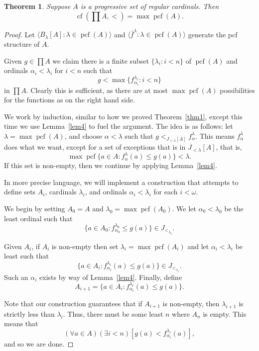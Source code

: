 \documentclass[10pt]{amsart}
\theoremstyle{plain}
\newtheorem{theorem}{Theorem}
\theoremstyle{definition}
\theoremstyle{remark}
\DeclareMathOperator{\cf}{cf}
\DeclareMathOperator{\pcf}{pcf}
\numberwithin{equation}{section}
\begin{document}
\begin{theorem}
\label{thm2}
Suppose $A$ is a progressive set of regular cardinals.  Then
\begin{equation}
\cf\left(\prod A, <\right) = \max\pcf(A).
\end{equation}
\end{theorem}
\begin{proof}
Let $\langle B_\lambda[A]:\lambda\in\pcf(A)\rangle$ and $\langle\bar{f}^\lambda:\lambda\in\pcf(A)\rangle$ generate the pcf structure of $A$.

Given $g\in\prod A$ we claim there is a finite subset $\{\lambda_i:i<n\}$ of $\pcf(A)$ and ordinals $\alpha_i<\lambda_i$ for $i<n$ such that
\begin{equation}
g<\max\{f^{\lambda_i}_{\alpha_i}:i<n\}
\end{equation}
in $\prod A$.  Clearly this is sufficient, as there are at most $\max\pcf(A)$ possibilities for the functions as on the right hand side.

We work by induction, similar to how we proved Theorem~\ref{thm1}, except this time we use Lemma~\ref{lem4} to fuel the argument. The idea is as follows: let $\lambda=\max\pcf(A)$, and choose $\alpha<\lambda$ such that $g<_{J_{<\lambda}[A]} f^\lambda_\alpha$.  This means $f^\lambda_\alpha$ does what we want, except for a set of exceptions that is in $J_{<\lambda}[A]$, that is,
\begin{equation}
\max\pcf\{a\in A: f^\lambda_\alpha(a)\leq g(a)\}<\lambda.
\end{equation}
If this set is non-empty, then we continue by applying Lemma~\ref{lem4}.

In more precise language, we will implement a construction that attempts to define sets $A_i$, cardinals $\lambda_i$, and ordinals $\alpha_i<\lambda_i$ for each $i<\omega$.

We begin by setting $A_0 = A$ and $\lambda_0=\max\pcf(A_0)$. We let $\alpha_0<\lambda_0$ be the least ordinal such that
\begin{equation}
\{a\in A_0 : f^{\lambda_0}_{\alpha_0}\leq g(a)\}\in J_{<_{\lambda_0}}.
\end{equation}

Given $A_i$, if $A_i$ is non-empty then set $\lambda_i = \max\pcf(A_i)$ and let $\alpha_i<\lambda_i$
be least such that
\begin{equation}
\{a\in A_i: f^{\lambda_i}_{\alpha_i}(a)\leq g(a)\}\in J_{<_{\lambda_i}}.
\end{equation}
Such an $\alpha_i$ exists by way of Lemma~\ref{lem4}.  Finally, define
\begin{equation}
A_{i+1} = \{a\in A_i: f^{\lambda_i}_{\alpha_i}(a)\leq g(a)\}.
\end{equation}

Note that our construction guarantees that if $A_{i+1}$ is non-empty, then $\lambda_{i+1}$ is strictly less than $\lambda_i$.  Thus, there must be some least $n$ where $A_n$ is empty.  This means that
\begin{equation}
(\forall a\in A)(\exists i< n)\left[ g(a)<f^{\lambda_i}_{\alpha_i}(a)\right],
\end{equation}
and so we are done.
\end{proof}
\end{document}
